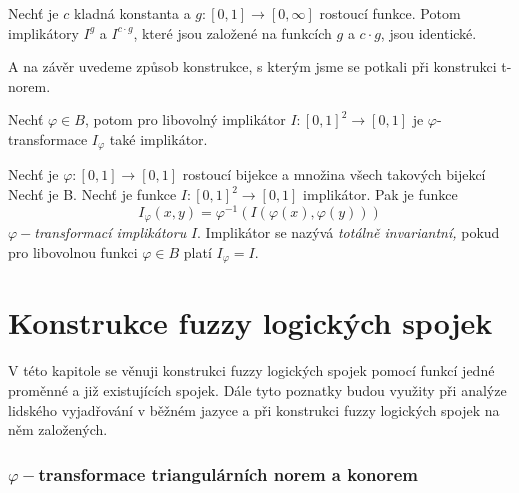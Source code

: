 \begin{sentence} \cite{habilitace}
    Nech\v t je $c$ kladn\'a konstanta a $g:[0,1] \to [0,\infty]$
    rostoucí  funkce. Potom implik\'atory $I^g$ a $I^{c \cdot g}$,
    které jsou zalo\v zen\'e na  funkcích $g$ a $c \cdot g$, jsou
    identick\'e.
\end{sentence}
A na z\'av\v er uvedeme zp\r usob konstrukce, s kter\'ym jsme se potkali p\v ri konstrukci t-norem.

\begin{sentence}\cite{Springer}
    Nech\v t $\varphi \in B$, potom pro libovolný implikátor $I: [0,1]^2 \rightarrow [0,1]$ je $\varphi$-transformace $I_\varphi$ také implikátor.
\end{sentence}

\begin{definition}\cite{Springer}
    Nech\v t je $\varphi:[0,1] \rightarrow [0,1]$  rostoucí
    bijekce a množina všech takových bijekcí Nech\v t je B. Nech\v t je funkce
    $I:[0,1]^2\rightarrow [0,1]$ 
    implikátor.
    Pak je funkce
    $$I_\varphi(x,y)=\varphi^{-1}(I(\varphi (x), \varphi (y)))$$
    $\varphi-${\em transformací implikátoru} $I.$ Implikátor se nazývá
    {\em totálně invariantní,} pokud pro libovolnou funkci $\varphi \in B$ platí $I_\varphi=I.$\\
\end{definition}

\chapter{Konstrukce fuzzy logick\'ych spojek}
\label{kap3}

V této kapitole se věnuji konstrukci fuzzy logických spojek pomocí funkcí jedné proměnné a již existujících spojek. Dále tyto poznatky budou využity při analýze lidského vyjadřování v běžném jazyce a při konstrukci fuzzy logických spojek na něm založených.

\subsection{$\varphi-$transformace triangulárních norem a konorem}

